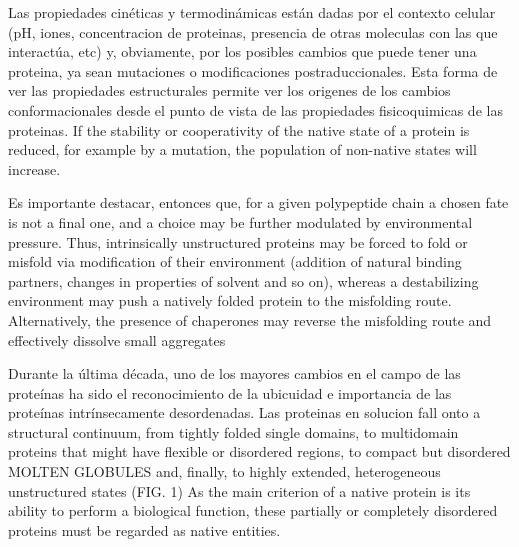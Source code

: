 Las propiedades cinéticas y termodinámicas están dadas por el contexto celular (pH, iones, concentracion de proteinas, presencia de otras moleculas con las que interactúa, etc) y, obviamente, por los posibles cambios que puede tener una proteina,
ya sean mutaciones o modificaciones postraduccionales.
Esta forma de ver las propiedades estructurales permite ver los origenes de los cambios conformacionales desde el punto de vista de las propiedades fisicoquimicas de las proteinas.
If the stability or cooperativity of the native state of a protein is reduced, for example by a mutation, the population of non-native states will increase.


Es importante destacar, entonces que, for a given polypeptide chain a chosen fate is not a final one, and a choice may be further modulated by environmental pressure. 
Thus, intrinsically unstructured proteins may be forced to fold or misfold via modification of their environment (addition of natural binding partners, changes in properties of solvent and so on), whereas a destabilizing environment may push a natively
folded protein to the misfolding route. Alternatively, the
presence of chaperones may reverse the misfolding route
and effectively dissolve small aggregates




Durante la última década, uno de los mayores cambios en el campo de las proteínas ha sido el reconocimiento de la ubicuidad e importancia de las proteínas intrínsecamente desordenadas. 
Las proteinas en solucion fall onto a structural continuum, from tightly folded single domains, to multidomain proteins that might have flexible or disordered regions, to compact but disordered MOLTEN GLOBULES and, finally, to highly extended, heterogeneous unstructured states (FIG. 1) 
As the main criterion of a native protein is its ability to perform a biological function, these partially or completely disordered proteins must be regarded as native entities.





